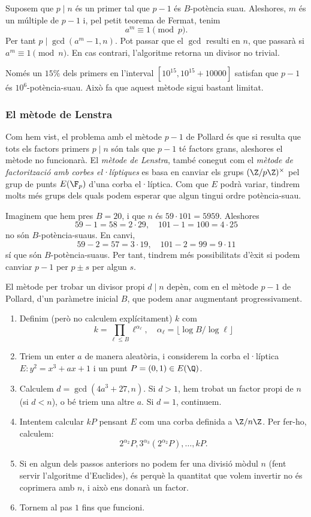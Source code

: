  Suposem que $p\mid n$ és un primer tal que $p-1$ és $B$-potència suau. Aleshores, $m$ és un múltiple de $p-1$ i, pel petit teorema de Fermat, tenim
 \[
 a^m\equiv 1\pmod p.
 \]
 Per tant $p\mid \gcd(a^m-1,n)$. Pot passar que el $\gcd$ resulti en $n$, que passarà si $a^m\equiv 1\pmod{n}$. En cas contrari, l'algoritme retorna un divisor no trivial.
 
 \begin{remark}
 Només un $15\%$ dels primers en l'interval $[10^{15},10^{15}+10000]$ satisfan que $p-1$ és $10^6$-potència-suau. Això fa que aquest mètode sigui bastant limitat.
 \end{remark}
  \subsubsection{El mètode de Lenstra}
 Com hem vist, el problema amb el mètode $p-1$ de Pollard és que si resulta que tots els factors primers $p\mid n$ són tals que $p-1$ té factors grans, aleshores el mètode no funcionarà. El \emph{mètode de Lenstra}, també conegut com el \emph{mètode de factorització amb corbes el·líptiques} es basa en canviar els grups $(\Z/p\Z)^\times$ pel grup de punts $E(\F_p)$ d'una corba el·líptica. Com que $E$ podrà variar, tindrem molts més grups dels quals podem esperar que algun tingui ordre potència-suau.
 
 \begin{example}
 Imaginem que hem pres $B=20$, i que $n$ és $59\cdot 101 = 5959$. Aleshores
 \[
 59-1 = 58=2\cdot 29,\quad 101-1=100=4\cdot25
 \]
 no són $B$-potència-suaus. En canvi,
 \[
 59-2 = 57 = 3\cdot 19,\quad
 101-2 = 99 = 9\cdot 11
 \]
 sí que són $B$-potència-suaus. Per tant, tindrem més possibilitats d'èxit si podem canviar $p-1$ per $p\pm s$ per algun $s$.
 \end{example}
 
 El mètode per trobar un divisor propi $d\mid n$ depèn, com en el mètode $p-1$ de Pollard, d'un paràmetre inicial $B$, que podem anar augmentant progressivament.
 \begin{enumerate}
 \item Definim (però no calculem explícitament) $k$ com
 \[
 k=\prod_{\ell\leq B} \ell^{\alpha_\ell},\quad\alpha_\ell = \lfloor\log B/\log\ell\rfloor
 \]
     \item Triem un enter $a$ de manera aleatòria, i considerem la corba el·líptica $E\colon y^2=x^3+ax+1$ i un punt $P=(0,1)\in E(\Q)$.
     \item Calculem $d=\gcd(4a^3+27,n)$. Si $d>1$, hem trobat un factor propi de $n$ (si $d<n$), o bé triem una altre $a$. Si $d=1$, continuem.
     \item Intentem calcular $kP$ pensant $E$ com una corba definida a $\Z/n\Z$. Per fer-ho, calculem:
     \[
     2^{\alpha_2} P, 3^{\alpha_3}(2^{\alpha_2}P),\ldots, kP. 
     \]
     \item Si en algun dels passos anteriors no podem fer una divisió mòdul $n$ (fent servir l'algoritme d'Euclides), és perquè la quantitat que volem invertir no és coprimera amb $n$, i això ens donarà un factor.
     \item Tornem al pas $1$ fins que funcioni.
 \end{enumerate}
 
